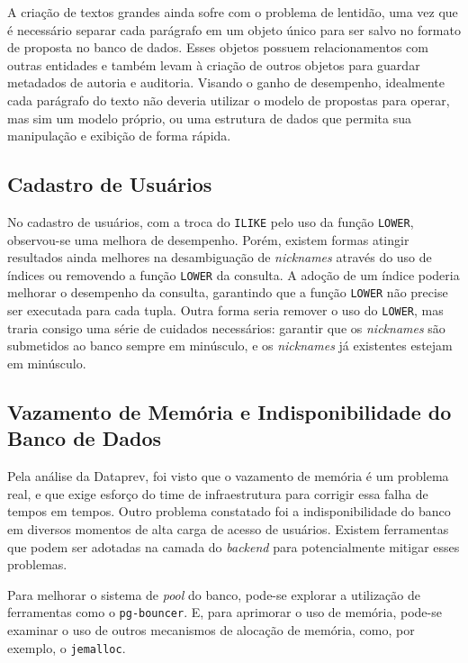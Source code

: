 A criação de textos grandes ainda sofre com o problema de lentidão, uma vez que é necessário separar cada parágrafo em um objeto único para ser salvo no formato de proposta no banco de dados.
Esses objetos possuem relacionamentos com outras entidades e também levam à criação de outros objetos para guardar metadados de autoria e auditoria.
Visando o ganho de desempenho, idealmente cada parágrafo do texto não deveria utilizar o modelo de propostas para operar, mas sim um modelo próprio, ou uma estrutura de dados que permita sua manipulação e exibição de forma rápida.

\subsection {Cadastro de Usuários}

No cadastro de usuários, com a troca do \texttt{ILIKE} pelo uso da função \texttt{LOWER}, observou-se uma melhora de desempenho.
Porém, existem formas atingir resultados ainda melhores na desambiguação de \textit{nicknames} através do uso de índices ou removendo a função \texttt{LOWER} da consulta.
A adoção de um índice poderia melhorar o desempenho da consulta, garantindo que a função \texttt{LOWER} não precise ser executada para cada tupla.
Outra forma seria remover o uso do \texttt{LOWER}, mas traria consigo uma série de cuidados necessários: garantir que os \textit{nicknames} são submetidos ao banco sempre em minúsculo, e os \textit{nicknames} já existentes estejam em minúsculo.

\subsection {Vazamento de Memória e Indisponibilidade do Banco de Dados}

Pela análise da Dataprev, foi visto que o vazamento de memória é um problema real, e que exige esforço do time de infraestrutura para corrigir essa falha de tempos em tempos.
Outro problema constatado foi a indisponibilidade do banco em diversos momentos de alta carga de acesso de usuários.
Existem ferramentas que podem ser adotadas na camada do \textit{backend} para potencialmente mitigar esses problemas.

Para melhorar o sistema de \textit{pool} do banco, pode-se explorar a utilização de ferramentas como o \texttt{pg-bouncer}.
E, para aprimorar o uso de memória, pode-se examinar o uso de outros mecanismos de alocação de memória, como, por exemplo, o \texttt{jemalloc}.
